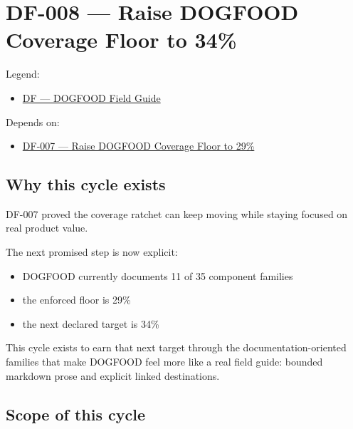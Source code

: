 \chapter{DF-008 --- Raise DOGFOOD Coverage Floor to 34\%}\label{record-070}

\smallskip

Legend:

\begin{itemize}
\tightlist
\item
  \href{https://github.com/flyingrobots/bijou/blob/1853ad902f6bf219326409e7f743a5a1d6517dbc/docs/legends/DF-dogfood-field-guide.md}{DF --- DOGFOOD Field Guide}
\end{itemize}

Depends on:

\begin{itemize}
\tightlist
\item
  \href{https://github.com/flyingrobots/bijou/blob/cbd70612140e7a450d764b3c7be1c6af878b99bc/docs/design/DF-007-raise-dogfood-coverage-floor-to-29-percent.md}{DF-007 --- Raise DOGFOOD Coverage Floor to 29\%}
\end{itemize}

\section{Why this cycle exists}\label{record-070-why-this-cycle-exists}

DF-007 proved the coverage ratchet can keep moving while staying focused on real product value.

The next promised step is now explicit:

\begin{itemize}
\tightlist
\item
  DOGFOOD currently documents 11 of 35 component families
\item
  the enforced floor is 29\%
\item
  the next declared target is 34\%
\end{itemize}

This cycle exists to earn that next target through the documentation-oriented families that make DOGFOOD feel more like a real field guide: bounded markdown prose and explicit linked destinations.

\section{Scope of this cycle}\label{record-070-scope-of-this-cycle}

